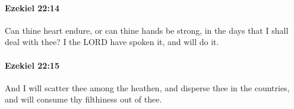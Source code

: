 		\paragraph{Ezekiel 22:14} %
			\label{EZEKIEL-22-14}

			Can thine heart endure, or can thine hands be strong, in the days that I shall deal with thee? I the LORD have spoken it, and will do it.


		\paragraph{Ezekiel 22:15} %
			\label{EZEKIEL-22-15}

			And I will scatter thee among the heathen, and disperse thee in the countries, and will consume thy filthiness out of thee.


